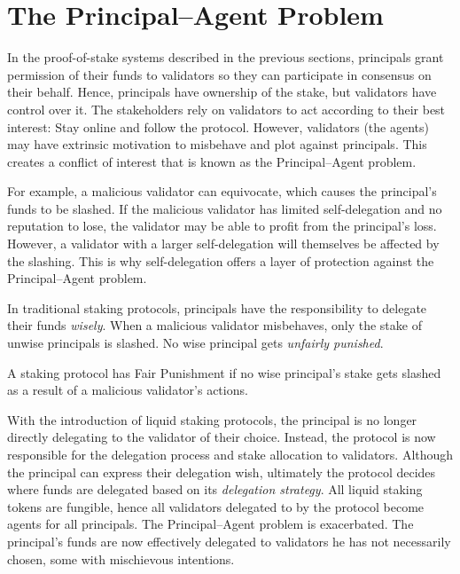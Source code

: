 \section{The Principal--Agent Problem}
In the proof-of-stake systems described in the previous sections,
principals grant permission of their funds to validators so they can
participate in consensus on their behalf.
Hence, principals have ownership of the stake, but
validators have control over it.
The stakeholders rely on validators to act according to their
best interest: Stay online and follow the protocol.
However, validators (the agents) may have extrinsic motivation to
misbehave and plot against principals. This creates
a conflict of interest that is known as the Principal--Agent problem.

For example, a malicious validator can equivocate, which causes
the principal's funds to be slashed. If the malicious validator has
limited self-delegation and no reputation to lose, the validator
may be able to profit from the principal's loss. However, a validator
with a larger self-delegation will themselves be affected by the slashing.
This is why self-delegation offers a layer of protection
against the Principal--Agent problem.

In traditional staking protocols, principals have the responsibility to
delegate their funds \emph{wisely}.
When a malicious validator misbehaves, only the stake of unwise principals is
slashed. No wise principal gets \emph{unfairly punished}.

\begin{definition}
    A staking protocol has Fair Punishment if no wise principal's
    stake gets slashed as a result of a malicious validator's actions.
\end{definition}

With the introduction of liquid staking protocols, the principal
is no longer directly delegating to the validator of their choice.
Instead, the protocol is now responsible for the delegation process
and stake allocation to validators.
Although the principal can express their delegation wish, ultimately
the protocol decides where funds are delegated based on its
\emph{delegation strategy}. All liquid staking tokens are fungible,
hence all validators delegated to by
the protocol become agents for all principals.
The Principal--Agent problem is exacerbated.
The principal's funds are now effectively delegated to validators
he has not necessarily chosen, some with mischievous intentions.